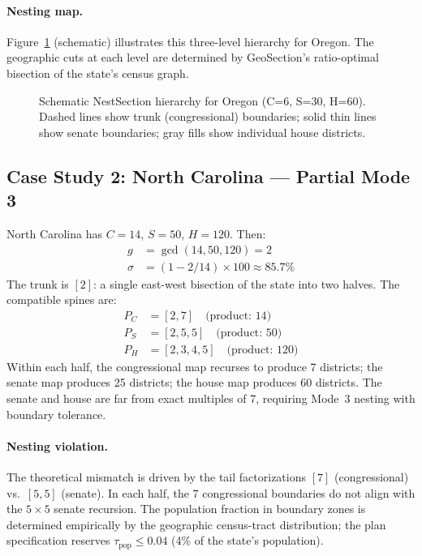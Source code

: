 \paragraph{Nesting map.} Figure~\ref{fig:or-nest} (schematic) illustrates this
three-level hierarchy for Oregon.  The geographic cuts at each level are
determined by GeoSection's ratio-optimal bisection of the state's census graph.

\begin{figure}[h]
\centering
{}
\caption{Schematic NestSection hierarchy for Oregon (C=6, S=30, H=60).
Dashed lines show trunk (congressional) boundaries; solid thin lines show
senate boundaries; gray fills show individual house districts.}
\label{fig:or-nest}
\end{figure}

\subsection{Case Study 2: North Carolina --- Partial Mode 3}

North Carolina has $C = 14$, $S = 50$, $H = 120$.  Then:
\begin{align*}
  g &= \gcd(14, 50, 120) = 2 \\
  \sigma &= (1 - 2/14) \times 100 \approx 85.7\%
\end{align*}
The trunk is $[2]$: a single east-west bisection of the state into two halves.
The compatible spines are:
\begin{align*}
  P_C &= [2, 7] \quad \text{(product: }14\text{)} \\
  P_S &= [2, 5, 5] \quad \text{(product: }50\text{)} \\
  P_H &= [2, 3, 4, 5] \quad \text{(product: }120\text{)}
\end{align*}
Within each half, the congressional map recurses to produce 7 districts; the
senate map produces 25 districts; the house map produces 60 districts.  The
senate and house are far from exact multiples of 7, requiring Mode~3 nesting
with boundary tolerance.

\paragraph{Nesting violation.}  The theoretical mismatch is driven by the tail
factorizations $[7]$ (congressional) vs.\ $[5,5]$ (senate).  In each half,
the 7 congressional boundaries do not align with the $5 \times 5$ senate
recursion.  The population fraction in boundary zones is determined empirically
by the geographic census-tract distribution; the plan specification reserves
$\tau_\text{pop} \leq 0.04$ (4\% of the state's population).

